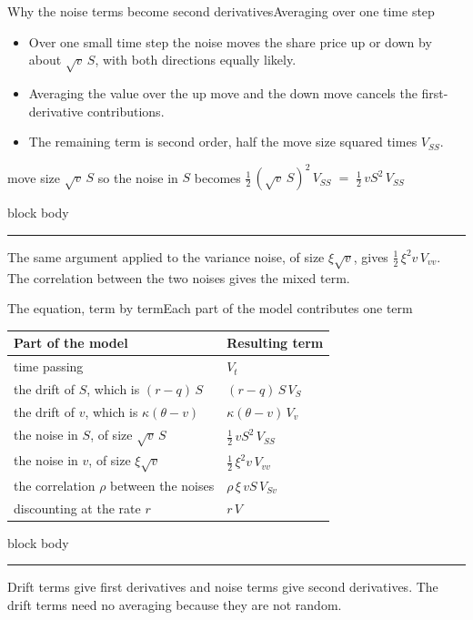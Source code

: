 \documentclass[aspectratio=169,11pt]{beamer}
\newcommand{\sigcallout}[1]{%
  \vfill
  \begin{beamercolorbox}[wd=\linewidth,sep=0.7em,rounded=true]{block body}
    {\color{sigblue}\rule{0.9ex}{0.9ex}}\hspace{0.5em}#1
  \end{beamercolorbox}%
}
\newcommand{\sigtable}[3]{%
  \begingroup
  \renewcommand{\arraystretch}{1.15}%
  \begin{table}\small
    \begin{tabular}{#1}
      \toprule
      #2 \\
      \midrule
      #3
      \bottomrule
    \end{tabular}
  \end{table}%
  \endgroup
}
\begin{document}
\begin{frame}{Why the noise terms become second derivatives}{Averaging over one time step}
  \begin{itemize}
    \item Over one small time step the noise moves the share price up or
      down by about $\sqrt{v}\,S$, with both directions equally likely.
    \item Averaging the value over the up move and the down move cancels
      the first-derivative contributions.
    \item The remaining term is second order, half the move size squared
      times $V_{SS}$.
  \end{itemize}
  \begin{center}
    move size $\sqrt{v}\,S$
    \qquad so the noise in $S$ becomes \qquad
    $\tfrac{1}{2}\,(\sqrt{v}\,S)^2\, V_{SS} \;=\; \tfrac{1}{2}\,v S^2\, V_{SS}$
  \end{center}
  \sigcallout{The same argument applied to the variance noise, of size
    $\xi\sqrt{v}$, gives $\tfrac{1}{2}\,\xi^2 v\, V_{vv}$. The correlation
    between the two noises gives the mixed term.}
\end{frame}

\begin{frame}{The equation, term by term}{Each part of the model contributes one term}
  \sigtable{ll}{\textbf{Part of the model} & \textbf{Resulting term}}{%
    time passing & $V_t$ \\
    the drift of $S$, which is $(r - q)\,S$ & $(r - q)\,S\,V_S$ \\
    the drift of $v$, which is $\kappa(\theta - v)$ & $\kappa(\theta - v)\,V_v$ \\
    the noise in $S$, of size $\sqrt{v}\,S$ & $\tfrac{1}{2}\,v S^2\, V_{SS}$ \\
    the noise in $v$, of size $\xi\sqrt{v}$ & $\tfrac{1}{2}\,\xi^2 v\, V_{vv}$ \\
    the correlation $\rho$ between the noises & $\rho\,\xi\,v S\, V_{Sv}$ \\
    discounting at the rate $r$ & $r\,V$ \\}
  \sigcallout{Drift terms give first derivatives and noise terms give
    second derivatives. The drift terms need no averaging because they are
    not random.}
\end{frame}
\end{document}
